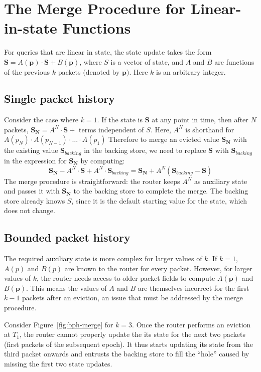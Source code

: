 \chapter{The Merge Procedure for Linear-in-state Functions}
\label{app:merge}

For queries that are linear in state, the state update takes the form $\mathbf{S} = A(\mathbf{p})\cdot\mathbf{S} + B(\mathbf{p})$, where $S$ is a vector of state, and $A$ and $B$ are functions of the previous $k$ packets (denoted by $\mathbf{p})$. Here $k$ is an arbitrary integer.

\section{Single packet history}

Consider the case where $k = 1$. If the state is $\mathbf{S}$ at any point in time, then after $N$ packets,
$\mathbf{S_N} = A^N\cdot \mathbf{S} + $ terms independent of $S$. Here, $A^N$ is shorthand for $A(p_N)\cdot A(p_{N-1}) \cdot \ldots \cdot A(p_1)$
Therefore to merge an evicted value $\mathbf{S_N}$ with the existing value $\mathbf{S}_{backing}$ in the backing store,
we need to replace $\mathbf{S}$ with $\mathbf{S}_{backing}$ in the expression for $\mathbf{S_N}$ by computing:
\[ \mathbf{S_N} - A^N \cdot \mathbf{S} + A^N \cdot \mathbf{S}_{backing} = \mathbf{S_N} + A^N(\mathbf{S}_{backing} - \mathbf{S}) \]
The merge procedure is straightforward: the router keeps $A^N$ as auxiliary state and passes it with $\mathbf{S_N}$ to the backing store to complete the merge.
The backing store already knows $S$, since it is the default starting value for the state, which does not change.

\section{Bounded packet history}

The required auxiliary state is more complex for larger values of $k$. If $k = 1$, $A(p)$ and $B(p)$ are known to the router for every packet. However, for larger values of $k$, the router needs access to older packet fields to compute $A(\mathbf{p})$ and $B(\mathbf{p})$. This means the values of $A$ and $B$ are themselves incorrect for the first $k-1$ packets after an eviction, an issue that must be addressed by the merge procedure.

Consider Figure~\ref{fig:bph-merge} for $k = 3$. Once the router performs an eviction at $T_1$,
the router cannot properly update the its state for the next two packets (first packets of the subsequent epoch).
It thus starts updating its state from the third packet onwards and entrusts the backing store to
fill the ``hole'' caused by missing the first two state updates.

